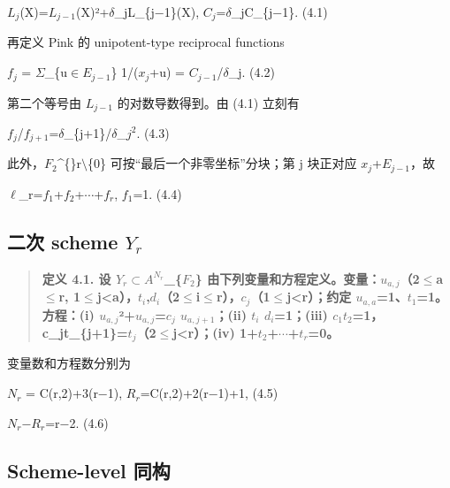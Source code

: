 \documentclass[11pt]{ctexart}
\begin{document}
\ensuremath{L_{j}}(X)=\ensuremath{L_{j−1}}(X)²+\ensuremath{\delta}\_jL\_\{j−1\}(X),    \ensuremath{C_{j}}=\ensuremath{\delta}\_jC\_\{j−1\}.    (4.1)

再定义 Pink 的 unipotent-type reciprocal functions

\ensuremath{f_{j}} = \ensuremath{\Sigma}\_\{u\ensuremath{\in}\ensuremath{E_{j−1}}\} 1/(\ensuremath{x_{j}}+u) = \ensuremath{C_{j−1}}/\ensuremath{\delta}\_j.    (4.2)

第二个等号由 \ensuremath{L_{j−1}} 的对数导数得到。由 (4.1) 立刻有

\ensuremath{f_{j}}/\ensuremath{f_{j+1}}=\ensuremath{\delta}\_\{j+1\}/\ensuremath{\delta}\_\ensuremath{j^2}.    (4.3)

此外，\ensuremath{F_2}\textasciicircum\{\}r\ensuremath{\setminus}\{0\} 可按“最后一个非零坐标”分块；第 j 块正对应 \ensuremath{x_{j}}+\ensuremath{E_{j−1}}，故

\ensuremath{\ell}\_r=\ensuremath{f_1}+\ensuremath{f_2}+\ensuremath{\cdots}+\ensuremath{f_{r}},    \ensuremath{f_1}=1.    (4.4)

\subsection{二次 scheme \ensuremath{Y_{r}}}

\begin{quote}\textbf{定义 4.1. 设 \ensuremath{Y_{r}}\ensuremath{\subset}\ensuremath{A^{N_{r}}}\_\{\ensuremath{F_2}\} 由下列变量和方程定义。变量：\ensuremath{u_{a,j}}（2\ensuremath{\le}a\ensuremath{\le}r, 1\ensuremath{\le}j<a），\ensuremath{t_{i}},\ensuremath{d_{i}}（2\ensuremath{\le}i\ensuremath{\le}r），\ensuremath{c_{j}}（1\ensuremath{\le}j<r）；约定 \ensuremath{u_{a,a}}=1、\ensuremath{t_1}=1。方程：(i) \ensuremath{u_{a,j}}²+\ensuremath{u_{a,j}}=\ensuremath{c_{j}} \ensuremath{u_{a,j+1}}；(ii) \ensuremath{t_{i}} \ensuremath{d_{i}}=1；(iii) \ensuremath{c_1}\ensuremath{t_2}=1，c\_jt\_\{j+1\}=\ensuremath{t_{j}}（2\ensuremath{\le}j<r）；(iv) 1+\ensuremath{t_2}+\ensuremath{\cdots}+\ensuremath{t_{r}}=0。}\end{quote}

变量数和方程数分别为

\ensuremath{N_{r}} = C(r,2)+3(r−1),    \ensuremath{R_{r}}=C(r,2)+2(r−1)+1,    (4.5)

\ensuremath{N_{r}}−\ensuremath{R_{r}}=r−2.    (4.6)

\subsection{Scheme-level 同构}
\end{document}
